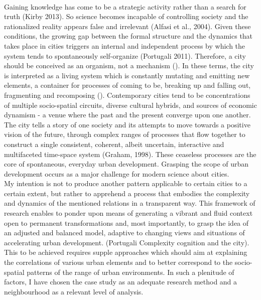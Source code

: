 \documentclass[11pt]{report}
\begin{document}
\\
Gaining knowledge has come to be a strategic activity rather than a search for truth (Kirby 2013). So science becomes incapable of controlling society and the rationalized reality appears false and irrelevant (Alfasi et al., 2004). Given these conditions, the growing gap between the formal structure and the dynamics that takes place in cities triggers an internal and independent process by which the system tends to spontaneously self-organize (Portugali 2011). Therefore, a city should be conceived as an organism, not a mechanism (\href{Charles Laundry, The Creativity City}{\citealt{Charles Laundry, The Creativity City}}). In these terms, the city is interpreted as a living system which is constantly mutating and emitting new elements, a container for processes of coming to be, breaking up and falling out, fragmenting and recomposing (\href{ref}{\citealt{ref}}). Contemporary cities tend to be concentrations of multiple socio-spatial circuits, diverse cultural hybrids, and sources of economic dynamism - a venue where the past and the present converge upon one another. The city tells a story of one society and its attempts to move towards a positive vision of the future, through complex ranges of processes that flow together to construct a single consistent, coherent, albeit uncertain, interactive and multifaceted time-space system (Graham, 1998). These ceaseless processes are the core of spontaneous, everyday urban development. Grasping the scope of urban development occurs as a major challenge for modern science about cities.
\\
My intention is not to produce another pattern applicable to certain cities to a certain extent, but rather to apprehend a process that embodies the complexity and dynamics of the mentioned relations in a transparent way.  This framework of research enables to ponder upon means of generating a vibrant and fluid context open to permanent transformations and, most importantly, to grasp the idea of an adjusted and balanced model, adaptive to changing views and situations of accelerating urban development. (Portugali Complexity cognition and the city). This to be achieved requires supple approaches which should aim at explaining the correlations of various urban elements and to better correspond to the socio-spatial patterns of the range of urban environments. In such a plenitude of factors, I have chosen the case study as an adequate research method and a neighbourhood as a relevant level of analysis.
\\
\end{document}
